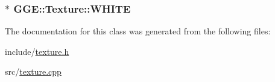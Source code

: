\hypertarget{class_g_g_e_1_1_texture_a0b90b74276704a2455ba2afa82cc13a7}{
\subsubsection[{W\+H\+I\+T\+E}]{$\ast$ G\+G\+E\+::\+Texture\+::\+W\+H\+I\+T\+E\hspace{0.3cm}{\ttfamily [static]}}}\label{class_g_g_e_1_1_texture_a0b90b74276704a2455ba2afa82cc13a7}


The documentation for this class was generated from the following files\+:\begin{DoxyCompactItemize}
\item 
include/\hyperlink{texture_8h}{texture.\+h}\item 
src/\hyperlink{texture_8cpp}{texture.\+cpp}\end{DoxyCompactItemize}
